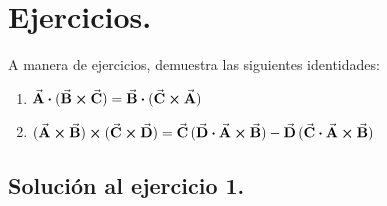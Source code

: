 \documentclass[hidelinks,12pt]{article}
\begin{document}
\section{Ejercicios.}

A manera de ejercicios, demuestra las siguientes identidades:
\begin{enumerate}
\item $\va{A} \vdot (\va{B} \cross \va{C}) = \va{B} \vdot (\va{C} \cross \va{A})$
\item $(\va{A} \cross \va{B}) \cross (\va{C} \cross \va{D}) = \va{C} \, ( \va{D} \vdot \va{A} \cross \va{B}) - \va{D} \, (\va{C} \vdot \va{A} \cross \va{B})$
\end{enumerate}

\subsection*{Solución al ejercicio 1.}
\end{document}
